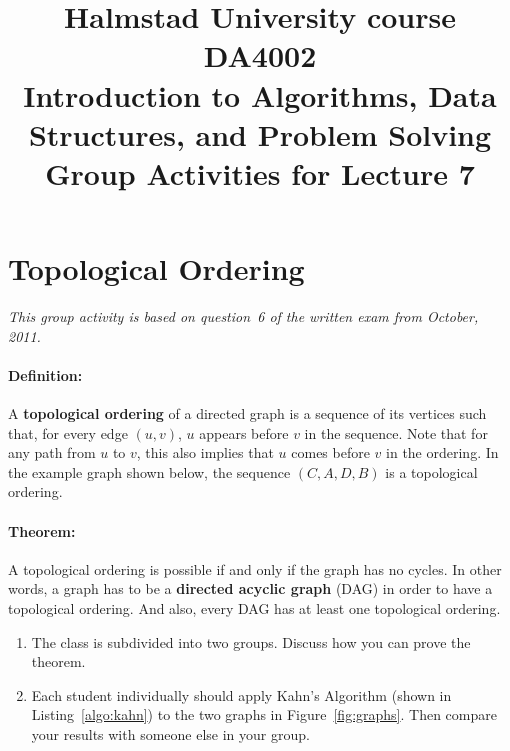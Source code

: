 \documentclass[a4paper]{article}
\begin{document}
\title{
  {\small
    Halmstad University course DA4002\\
    Introduction to Algorithms, Data Structures, and Problem Solving\\
  }
  Group Activities for Lecture 7
}
\maketitle



\section{Topological Ordering}

\emph{This group activity is based on question~6 of the written exam from October, 2011.}

\paragraph{Definition:}
A \textbf{topological ordering} of a directed graph is a sequence of its vertices such that, for every edge $(u,v)$, $u$ appears before $v$ in the sequence.
Note that for any path from $u$ to $v$, this also implies that $u$ comes before $v$ in the ordering.
In the example graph shown below, the sequence $(C,A,D,B)$ is a topological ordering.

\begin{center}
\end{center}

\paragraph{Theorem:}
A topological ordering is possible if and only if the graph has no cycles.
In other words, a graph has to be a \textbf{directed acyclic graph} (DAG) in order to have a topological ordering.
And also, every DAG has at least one topological ordering.

\begin{enumerate}
\item
  The class is subdivided into two groups.
  Discuss how you can prove the theorem.
\item
  Each student individually should apply Kahn's Algorithm (shown in Listing~\ref{algo:kahn}) to the two graphs in Figure~\ref{fig:graphs}.
  Then compare your results with someone else in your group.
\end{enumerate}
\end{document}
